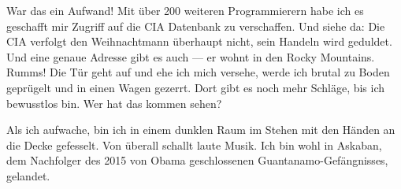 War das ein Aufwand! Mit über 200 weiteren Programmierern habe ich es geschafft mir Zugriff auf die CIA Datenbank zu verschaffen. Und siehe da: Die CIA verfolgt den Weihnachtmann überhaupt nicht, sein Handeln wird geduldet. Und eine genaue Adresse gibt es auch — er wohnt in den Rocky Mountains. Rumms! Die Tür geht auf und ehe ich mich versehe, werde ich brutal zu Boden geprügelt und in einen Wagen gezerrt. Dort gibt es noch mehr Schläge, bis ich bewusstlos bin. Wer hat das kommen sehen?

Als ich aufwache, bin ich in einem dunklen Raum im Stehen mit den Händen an die Decke gefesselt. Von überall schallt laute Musik. Ich bin wohl in Askaban, dem Nachfolger des 2015 von Obama geschlossenen Guantanamo-Gefängnisses, gelandet.